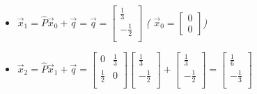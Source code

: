 \documentclass[professionalfonts]{beamer}
\begin{document}
{\begin{itemize}
\item $\vec{x}_1 = \hat{P}\vec{x}_0 + \vec{q} = \vec{q} = \left[ \begin{array}{c} \frac{1}{3} \\ -\frac{1}{2}\\ \end{array} \right]$
{\it ( $\vec{x}_0=\left[ \begin{array}{c} 0\\ 0 \end{array} \right]$)}
\item $\vec{x}_2 = \hat{P}\vec{x}_1 + \vec{q} =
\left[ \begin{array}{cc} 0 & \frac{1}{3} \\ \frac{1}{2} & 0\\ \end{array} \right]
\left[ \begin{array}{c} \frac{1}{3} \\ -\frac{1}{2}\\ \end{array} \right]+
\left[ \begin{array}{c} \frac{1}{3} \\ -\frac{1}{2}\\ \end{array} \right] = 
\left[ \begin{array}{c} \frac{1}{6} \\ -\frac{1}{3}\\ \end{array} \right] $
\end{itemize}}
\end{document}
